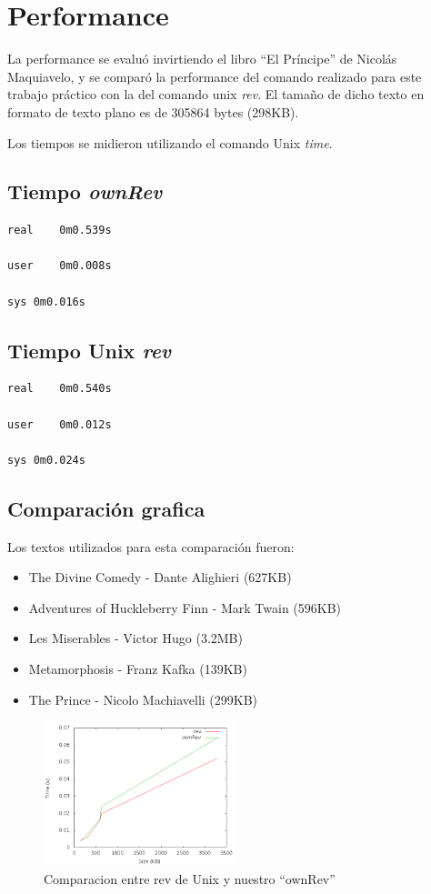 \documentclass{article}
\begin{document}
\section{Performance}

La performance se evaluó invirtiendo el libro ``El Príncipe'' de Nicolás Maquiavelo, y se comparó
la performance del comando realizado para este trabajo práctico con la del comando unix \emph{rev}.
El tamaño de dicho texto en formato de texto plano es de 305864 bytes (298KB).

Los tiempos se midieron utilizando el comando Unix \emph{time}.

\subsection{Tiempo \emph{ownRev}}

\begin{verbatim}
real	0m0.539s

user	0m0.008s

sys	0m0.016s
\end{verbatim}



\subsection{Tiempo Unix \emph{rev}}

\begin{verbatim}
real	0m0.540s

user	0m0.012s

sys	0m0.024s
\end{verbatim}

\subsection{Comparación grafica}

Los textos utilizados para esta comparación fueron: 
\begin{itemize}
\item The Divine Comedy - Dante Alighieri (627KB)
\item Adventures of Huckleberry Finn - Mark Twain (596KB)
\item Les Miserables - Victor Hugo (3.2MB)
\item Metamorphosis - Franz Kafka (139KB)
\item The Prince - Nicolo Machiavelli (299KB)
\end{itemize}

\begin{figure}[h!]
  \caption{Comparacion entre rev de Unix y nuestro ``ownRev''}
  \centering
    \includegraphics[width=0.5\textwidth]{TestFiles/times.png}
\end{figure}
\end{document}
